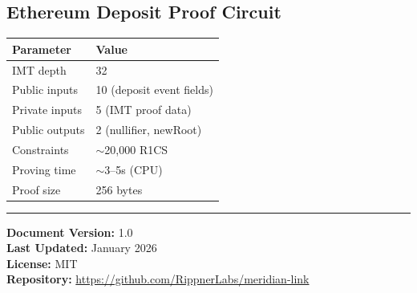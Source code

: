 \documentclass[11pt,a4paper,twoside]{article}
\begin{document}
\subsection{Ethereum Deposit Proof Circuit}

\begin{table}[H]
\centering
\begin{tabular}{@{}ll@{}}
\toprule
\textbf{Parameter} & \textbf{Value} \\
\midrule
IMT depth & 32 \\
Public inputs & 10 (deposit event fields) \\
Private inputs & 5 (IMT proof data) \\
Public outputs & 2 (nullifier, newRoot) \\
Constraints & $\sim$20,000 R1CS \\
Proving time & $\sim$3--5s (CPU) \\
Proof size & 256 bytes \\
\bottomrule
\end{tabular}
\end{table}

\vfill
\begin{center}
\rule{0.5\textwidth}{0.4pt}

\textbf{Document Version:} 1.0 \\
\textbf{Last Updated:} January 2026 \\
\textbf{License:} MIT \\
\textbf{Repository:} \url{https://github.com/RippnerLabs/meridian-link}
\end{center}
\end{document}
